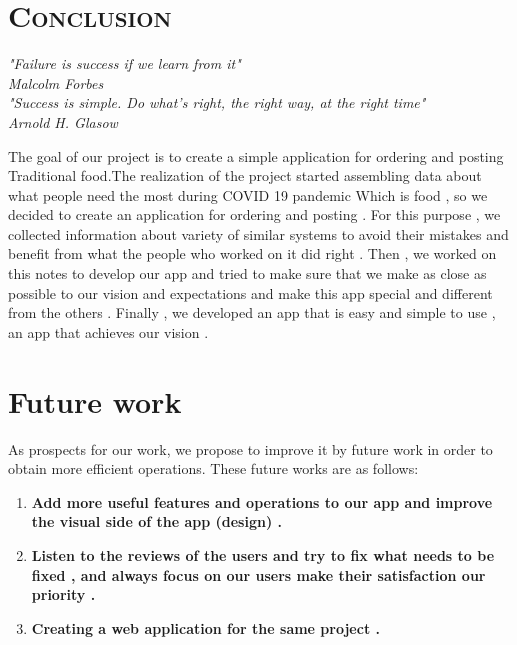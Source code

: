 \newpage
\section{\textsc{Conclusion}}

 \lhead{}
 \cfoot{ \thepage}
  \pagestyle{fancy}
\renewcommand{\headrulewidth}{0.4pt}

\begin{flushright}
\textit{"Failure is success if we learn from it"\\
Malcolm Forbes\\
"Success is simple. Do what's right, the right way, at the right time"\\ Arnold H. Glasow }
\end{flushright}
{\large The goal of our project is to create a simple application for ordering and posting Traditional food.The realization of the project started assembling data about what people need the most during COVID 19 pandemic Which is food , so we decided to create an application for ordering and posting . For this purpose , we collected information about variety of similar systems to avoid their mistakes and benefit from what the people who worked on it did right . Then , we worked on this notes to develop our app and tried to make sure that we make as close as possible to our vision and expectations and make this app special and different from the others  . Finally , we developed an app that is easy and simple to use , an app that achieves our vision .  }


\section*{Future work}
As prospects for our work, we propose to improve it by future work in order to obtain more efficient operations. These future works are as follows:\begin{enumerate}    
\item \textbf{Add more useful features and operations to our app and improve the visual side of the app (design) . }
\item \textbf{Listen to the reviews of the users and try to fix what needs to be fixed , and always focus on our users make their satisfaction our priority . }
\item \textbf{ Creating a web application for the same project .
}
\end{enumerate}



